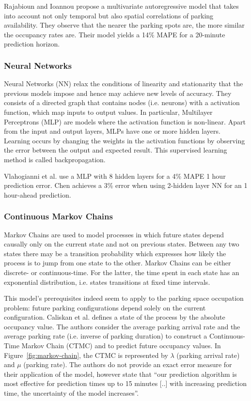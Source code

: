 \documentclass{article}
\begin{document}
\vspace{2mm}
Rajabioun and Ioannou\cite{Rajabioun} propose a multivariate autoregressive model that takes into account not only temporal but also spatial correlations of parking availability. They observe that the nearer the parking spots are, the more similar the occupancy rates are. Their model yields a 14\% MAPE for a 20-minute prediction horizon.

\subsubsection{Neural Networks}
\label{sec:neural-networks}
Neural Networks (NN) relax the conditions of linearity and stationarity that the previous models impose and hence may achieve new levels of accuracy. They consists of a directed graph that contains nodes (i.e. neurons) with a  activation function, which map inputs to output values. In particular, Multilayer Perceptrons (MLP) are models where the activation function is non-linear. Apart from the input and output layers, MLPs have one or more hidden layers. Learning occurs by changing the weights in the activation functions by observing the error between the output and expected result. This supervised learning method is called backpropagation.

\vspace{2mm}
Vlahogianni et al.\cite{Vlahogianni} use a MLP with 8 hidden layers for a 4\% MAPE 1 hour prediction error. Chen\cite{Chen} achieves a 3\% error when using 2-hidden layer NN for an 1 hour-ahead prediction.

\subsubsection{Continuous Markov Chains}
Markov Chains are used to model processes in which future states depend causally only on the current state and not on previous states. Between any two states there may be a transition probability which expresses how likely the process is to jump from one state to the other. Markov Chains can be either discrete- or continuous-time. For the latter, the time spent in each state has an exponential distribution, i.e. states transitions at fixed time intervals.

\vspace{2mm}
This model's prerequisites indeed seem to apply to the parking space occupation problem: future parking configurations depend solely on the current configuration. Caliskan et al.\cite{Caliskan2007} defines a state of the process by the absolute occupancy value. The authors consider the average parking arrival rate and the average parking rate (i.e. inverse of parking duration) to construct a Continuous-Time Markov Chain (CTMC) and to predict future occupancy values. In Figure~\ref{fig:markov-chain}, the CTMC is represented by $\lambda$ (parking arrival rate) and $\mu$ (parking rate). The authors do not provide an exact error measure for their application of the model, however state that ``our prediction algorithm is most effective for prediction times up to 15 minutes [..] with increasing prediction time, the uncertainty of the model increases''.
\end{document}
